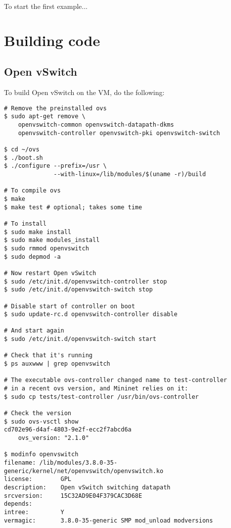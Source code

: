 To start the first example...

\section{Building code}
\label{chapter:compiling}

\subsection{Open vSwitch}
\label{chapter:compiling.ovs}

To build Open vSwitch on the VM, do the following:

\begin{Verbatim}
# Remove the preinstalled ovs
$ sudo apt-get remove \
    openvswitch-common openvswitch-datapath-dkms
    openvswitch-controller openvswitch-pki openvswitch-switch

$ cd ~/ovs
$ ./boot.sh
$ ./configure --prefix=/usr \
              --with-linux=/lib/modules/$(uname -r)/build

# To compile ovs
$ make
$ make test # optional; takes some time

# To install
$ sudo make install
$ sudo make modules_install
$ sudo rmmod openvswitch
$ sudo depmod -a

# Now restart Open vSwitch
$ sudo /etc/init.d/openvswitch-controller stop
$ sudo /etc/init.d/openvswitch-switch stop

# Disable start of controller on boot
$ sudo update-rc.d openvswitch-controller disable

# And start again
$ sudo /etc/init.d/openvswitch-switch start

# Check that it's running
$ ps auxwww | grep openvswitch

# The executable ovs-controller changed name to test-controller
# in a recent ovs version, and Mininet relies on it:
$ sudo cp tests/test-controller /usr/bin/ovs-controller

# Check the version
$ sudo ovs-vsctl show
cd702e96-d4af-4803-9e2f-ecc2f7abcd6a
    ovs_version: "2.1.0"

$ modinfo openvswitch
filename: /lib/modules/3.8.0-35-generic/kernel/net/openvswitch/openvswitch.ko
license:        GPL
description:    Open vSwitch switching datapath
srcversion:     15C32AD9E04F379CAC3D68E
depends:
intree:         Y
vermagic:       3.8.0-35-generic SMP mod_unload modversions
\end{Verbatim}

